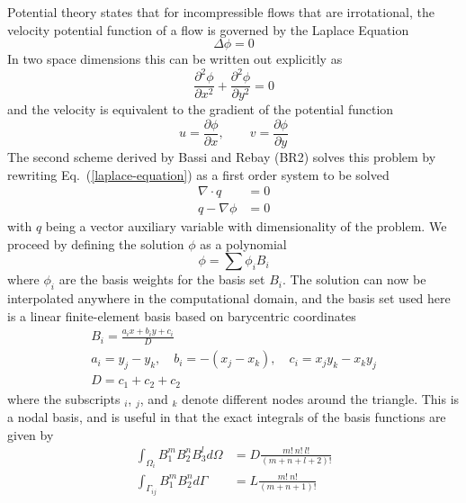\documentclass[a4paper]{article}
\newcommand{\eref}[1]{Eq.~(\ref{#1})}
\newcommand{\dint}[1]{\int_{\Omega_i}{#1 d\Omega}}
\newcommand{\sint}[1]{\int_{\Gamma_{ij}}{#1 d\Gamma}}
\begin{document}
Potential theory states that for incompressible flows that are irrotational, the
velocity potential function of a flow is governed by the Laplace Equation
\begin{equation}
  \Delta \phi = 0
  \label{laplace-equation}
\end{equation}
In two space dimensions this can be written out explicitly as
\begin{equation}
  \frac{\partial^2 \phi}{\partial x^2} 
  + \frac{\partial^2 \phi}{\partial y^2} = 0
  \label{2d-laplace}
\end{equation}
and the velocity is equivalent to the gradient of the potential function
\begin{equation}
  u = \frac{\partial \phi}{\partial x}, \qquad v = \frac{\partial \phi}{\partial y}
  \label{uv-def}
\end{equation}
The second scheme derived by Bassi and Rebay (BR2) solves this problem by
rewriting \eref{laplace-equation} as a first order system to be solved 
\begin{align}
  \nabla \cdot q &= 0 \\
  q - \nabla \phi &= 0
  \label{first-order-sys}
\end{align}
with $q$ being a vector auxiliary variable with dimensionality of the problem.
We proceed by defining the solution $\phi$ as a polynomial \begin{equation}
  \phi = \sum{\phi_i B_i}
  \label{fem-soln}
\end{equation}
where $\phi_i$ are the basis weights for the basis set $B_i$.  The solution can
now be interpolated anywhere in the computational domain, and the basis set used
here is a linear finite-element basis based on barycentric coordinates
\begin{equation}
  \begin{gathered}
    B_i = \frac{a_i x + b_i y + c_i}{D} \\
    a_i = y_j-y_k, \quad 
    b_i = -(x_j - x_k), \quad
    c_i = x_j y_k - x_k y_j  \\
    D = c_1 + c_2 + c_2
  \end{gathered}
  \label{basis}
\end{equation}
where the subscripts $_i$, $_j$, and $_k$ denote different nodes around the
triangle. This is a nodal basis, and is useful in that the exact integrals of
the basis functions are given by
\begin{align}
  \dint{B_1^{m}B_2^{n}B_3^{l}} &= D \frac{m!\ n!\ l!}{(m+n+l+2)!}
  \label{dom-integral-def} \\
  \sint{B_1^{m}B_2^{n}} &= L \frac{m!\ n!}{(m+n+1)!}
  \label{edge-integral-def}
\end{align}
\end{document}
